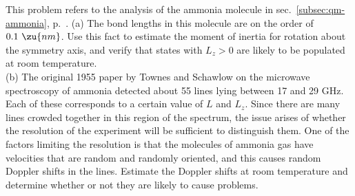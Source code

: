 This problem refers to the analysis of the ammonia molecule in sec.~\ref{subsec:qm-ammonia}, p.~\pageref{subsec:qm-ammonia}.
(a) The bond lengths in this molecule are on the order of $0.1\ \zu{nm}$. Use this fact to estimate the moment of
inertia for rotation about the symmetry axis, and verify that states with $L_z>0$ are likely to be populated at
room temperature.\\
(b) The original 1955 paper by Townes and Schawlow on the microwave spectroscopy of ammonia detected about 55
lines lying between 17 and 29 GHz. Each of these corresponds to a certain value of $L$ and $L_z$. Since there
are many lines crowded together in this region of the spectrum, the issue arises of whether the resolution
of the experiment will be sufficient to distinguish them. One of the factors limiting the resolution is that
the molecules of ammonia gas have velocities that are random and randomly oriented, and this causes random
Doppler shifts in the lines. Estimate the Doppler shifts at room temperature and determine whether or not they
are likely to cause problems.
